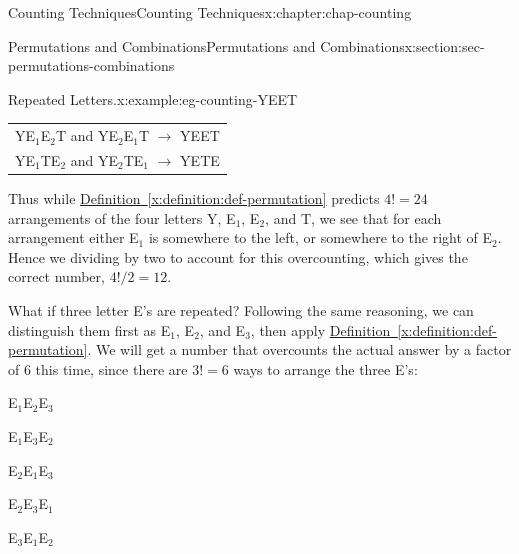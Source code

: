 \documentclass[oneside,10pt,]{book}
\newcommand{\tabularfont}{\relax}
\newcommand{\xreffont}{\relax}
\numberwithin{equation}{section}
\begin{document}
\begin{chapterptx}{Counting Techniques}{}{Counting Techniques}{}{}{x:chapter:chap-counting}
\begin{sectionptx}{Permutations and Combinations}{}{Permutations and Combinations}{}{}{x:section:sec-permutations-combinations}
\begin{example}{Repeated Letters.}{x:example:eg-counting-YEET}
\begin{sidebyside}{1}{0.15}{0.15}{0}%
\begin{sbspanel}{0.7}%
{\centering%
{\tabularfont%
\begin{tabular}{l}
YE\(_1\)E\(_2\)T and YE\(_2\)E\(_1\)T \(\rightarrow\) YEET\tabularnewline[0pt]
YE\(_1\)TE\(_2\) and YE\(_2\)TE\(_1\) \(\rightarrow\) YETE
\end{tabular}
}%
\par}
\end{sbspanel}%
\end{sidebyside}%
\par
Thus while \hyperref[x:definition:def-permutation]{Definition~{\xreffont\ref{x:definition:def-permutation}}} predicts \(4! = 24\) arrangements of the four letters Y, E\(_1\), E\(_2\), and T, we see that for each arrangement either E\(_1\) is somewhere to the left, or somewhere to the right of E\(_2\). Hence we dividing by two to account for this overcounting, which gives the correct number, \(4!/2 = 12\).%
\end{example}
What if three letter E's are repeated? Following the same reasoning, we can distinguish them first as E\(_1\), E\(_2\), and E\(_3\), then apply \hyperref[x:definition:def-permutation]{Definition~{\xreffont\ref{x:definition:def-permutation}}}. We will get a number that overcounts the actual answer by a factor of 6 this time, since there are \(3! = 6\) ways to arrange the three E's:%
\begin{sidebyside}{6}{0.0233333333333333}{0.0233333333333333}{0.0466666666666667}%
\begin{sbspanel}{0.12}%
E\(_1\)E\(_2\)E\(_3\)%
\end{sbspanel}%
\begin{sbspanel}{0.12}%
\par
E\(_1\)E\(_3\)E\(_2\)%
\end{sbspanel}%
\begin{sbspanel}{0.12}%
\par
E\(_2\)E\(_1\)E\(_3\)%
\end{sbspanel}%
\begin{sbspanel}{0.12}%
\par
E\(_2\)E\(_3\)E\(_1\)%
\end{sbspanel}%
\begin{sbspanel}{0.12}%
\par
E\(_3\)E\(_1\)E\(_2\)%
\end{sbspanel}%
\begin{sbspanel}{0.12}%
\par

\end{sbspanel}
\end{sidebyside}
\end{sectionptx}
\end{chapterptx}
\end{document}
